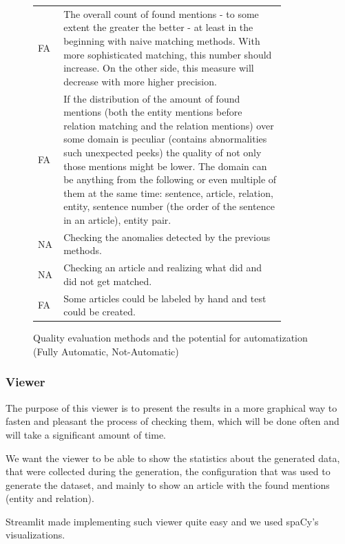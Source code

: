 \begin{figure}

\begin{tabular}{p{0.05\linewidth}p{0.8\linewidth}}

FA & The overall count of found mentions - to some extent the greater the better - at least in the beginning with naive matching methods. With more sophisticated matching, this number should increase. On the other side, this measure will decrease with more higher precision. \\ 
FA & If the distribution of the amount of found mentions (both the entity mentions before relation matching and the relation mentions) over some domain is peculiar (contains abnormalities such unexpected peeks) the quality of not only those mentions might be lower. The domain can be anything from the following or even multiple of them at the same time:
sentence, article, relation, entity, sentence number (the order of the sentence in an article), entity pair. \\ 
NA & Checking the anomalies detected by the previous methods.  \\ 
NA & Checking an article and realizing what did and did not get matched. \\ 
FA & Some articles could be labeled by hand and test could be created.\\

\end{tabular} 

\caption{Quality evaluation methods and the potential for automatization (Fully Automatic, Not-Automatic)}
\label{tab:qualityEval}
\end{figure}


\subsubsection{Viewer}
The purpose of this viewer is to present the results in a more graphical way to fasten and pleasant the process of checking them, which will be done often and will take a significant amount of time.

We want the viewer to be able to show the statistics about the generated data, that were collected during the generation, the configuration that was used to generate the dataset, and mainly to show an article with the found mentions (entity and relation). 

Streamlit made implementing such viewer quite easy and we used spaCy’s  visualizations. 

